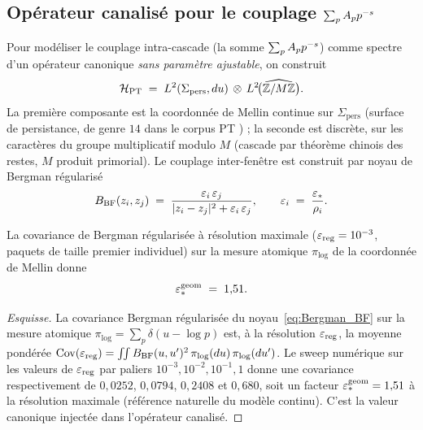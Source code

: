 \subsection{Opérateur canalisé pour le couplage $\sum_p A_p p^{-s}$}
\label{sec:operateur_canalise}

Pour modéliser le couplage intra-cascade (la somme $\sum_p A_p p^{-s}$)
comme spectre d'un opérateur canonique \emph{sans paramètre ajustable},
on construit
\begin{equation}
\mathcal{H}_{\mathrm{PT}}
\;=\;
L^{2}(\Sigma_{\mathrm{pers}}, du) \,\otimes\, L^{2}\!\big(\widehat{\mathbb{Z}/M\mathbb{Z}}\big).
\label{eq:H_PT_def}
\end{equation}
La première composante est la coordonnée de Mellin continue sur
$\Sigma_{\mathrm{pers}}$ (surface de persistance, de genre $14$ dans le
corpus PT \cite{PT_GeoSpectral}) ; la seconde est discrète, sur les
caractères du groupe multiplicatif modulo $M$ (cascade par théorème
chinois des restes, $M$ produit primorial). Le couplage inter-fenêtre est
construit par noyau de Bergman régularisé
\begin{equation}
B_{\mathrm{BF}}(z_i, z_j)
\;=\;
\frac{\varepsilon_i\,\varepsilon_j}{|z_i - z_j|^{2} + \varepsilon_i\,\varepsilon_j},
\qquad
\varepsilon_i \;=\; \frac{\varepsilon_{*}}{\rho_i}.
\label{eq:Bergman_BF}
\end{equation}

\begin{lemme}
\label{lem:epsstar_geom}
La covariance de Bergman régularisée à résolution maximale
($\varepsilon_{\mathrm{reg}} = 10^{-3}$, paquets de taille premier individuel)
sur la mesure atomique $\pi_{\log}$ de la coordonnée de Mellin donne
\begin{equation}
\varepsilon_{*}^{\mathrm{geom}} \;=\; 1{,}51.
\label{eq:epsstar_geom}
\end{equation}
\end{lemme}

\begin{proof}[Esquisse]
La covariance Bergman régularisée du noyau~\eqref{eq:Bergman_BF} sur la
mesure atomique $\pi_{\log} = \sum_p \delta(u - \log p)$ est, à la
résolution $\varepsilon_{\mathrm{reg}}$, la moyenne pondérée
$\mathrm{Cov}(\varepsilon_{\mathrm{reg}}) = \int\!\!\int B_{\mathrm{BF}}(u, u')^{2}\,
\pi_{\log}(du)\,\pi_{\log}(du')$. Le sweep numérique sur les valeurs de
$\varepsilon_{\mathrm{reg}}$ par paliers $10^{-3}, 10^{-2}, 10^{-1}, 1$ donne
une covariance respectivement de $0{,}0252$, $0{,}0794$, $0{,}2408$ et
$0{,}680$, soit un facteur $\varepsilon_{*}^{\mathrm{geom}} = 1{,}51$ à la
résolution maximale (référence naturelle du modèle continu). C'est la
valeur canonique injectée dans l'opérateur canalisé.
\end{proof}

